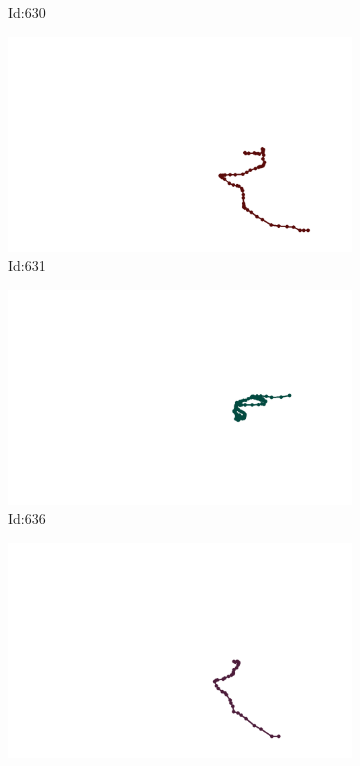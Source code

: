 \documentclass[12pt,twoside]{report}
\begin{document}
\begin{figure}
\begin{subfigure}[b]{0.20\textwidth}
\caption{Id:630}
\end{subfigure}
\begin{subfigure}[b]{0.20\textwidth}
\centering
\includegraphics[width=\textwidth]{../trajectories/631.png}
\caption{Id:631}
\end{subfigure}
\begin{subfigure}[b]{0.20\textwidth}
\centering
\includegraphics[width=\textwidth]{../trajectories/636.png}
\caption{Id:636}
\end{subfigure}
\begin{subfigure}[b]{0.20\textwidth}
\centering
\includegraphics[width=\textwidth]{../trajectories/641.png}

\end{subfigure}
\end{figure}
\end{document}
